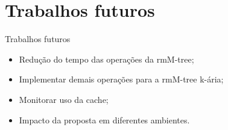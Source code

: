 \section{Trabalhos futuros}

\begin{frame}{Trabalhos futuros}
    \begin{itemize}
        \item Redução do tempo das operações da rmM-tree;
        \item Implementar demais operações para a rmM-tree k-ária;
        \item Monitorar uso da cache;
        \item Impacto da proposta em diferentes ambientes.
    \end{itemize}
\end{frame}

